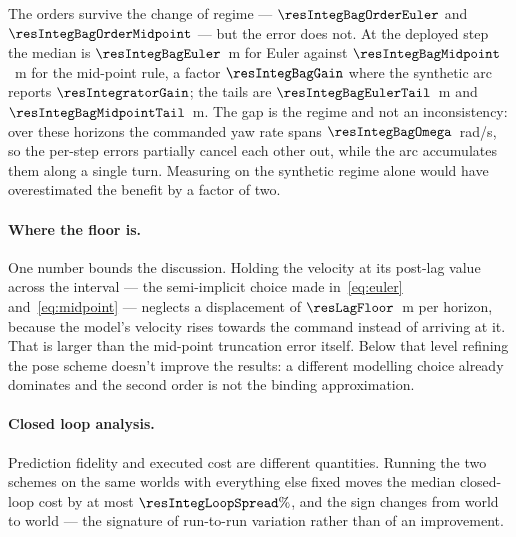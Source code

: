 \documentclass[11pt,a4paper]{article}
\begin{document}
\begin{table}[htbp]
  \centering
  \small
  \caption{%
  Median position error at the end of the horizon, over 12 horizons re-solved from a bag of data recorded during the navigation, against the exact arc on the same velocity sequence. The first row is the
  deployed step; the others subdivide the prediction interval without changing the input.}
  \label{res:tab:integbag}
\end{table}

The orders survive the change of regime --- $\resIntegBagOrderEuler$ and $\resIntegBagOrderMidpoint$ --- but
the error does not. At the deployed step the median is $\resIntegBagEuler$~m for Euler against
$\resIntegBagMidpoint$~m for the mid-point rule, a factor $\resIntegBagGain$ where the synthetic arc reports
$\resIntegratorGain$; the tails are $\resIntegBagEulerTail$~m and $\resIntegBagMidpointTail$~m. The gap is
the regime and not an inconsistency: over these horizons the commanded yaw rate spans
$\resIntegBagOmega$~rad/s, so the per-step errors partially cancel each other out, while the arc accumulates them along a
single turn. Measuring on the synthetic regime alone would have overestimated the benefit by a factor of two.

\paragraph{Where the floor is.} One number bounds the discussion. Holding the velocity at its post-lag value
across the interval --- the semi-implicit choice made in~\eqref{eq:euler} and~\eqref{eq:midpoint} --- neglects
a displacement of $\resLagFloor$~m per horizon, because the model's velocity rises towards the command
instead of arriving at it. That is larger than the mid-point truncation error itself. Below that level
refining the pose scheme doesn't improve the results: a different modelling choice already dominates and the second
order is not the binding approximation.

\paragraph{Closed loop analysis.} Prediction fidelity and executed cost are different quantities.
Running the two schemes on the same worlds with everything else fixed moves the median closed-loop cost by at
most $\resIntegLoopSpread\%$, and the sign changes from world to world --- the signature of run-to-run
variation rather than of an improvement.
\end{document}
